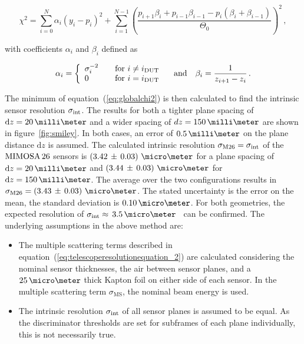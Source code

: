 \begin{equation}
\label{eq:globalchi2}
\chi^2 = \sum_{i=0}^{N} \alpha_i \left( y_i - p_i \right)^2 + \sum_{i=1}^{N-1}
\left( \frac{p_{i + 1} \beta_i + p_{i-1} \beta_{i-1} - p_i \left( \beta_i + \beta_{i-1} \right)}{\Theta_0} \right)^2 \,,
\end{equation}

\noindent
with coefficients $\alpha_i$ and $\beta_i$ defined as~\cite{ref:eudetmemo_2007_01}

\begin{equation}
\alpha_i = \left\{
  \begin{array}{l l}
    \sigma_{i}^{-2} & \quad \text{for $i \neq i_{\textrm{DUT}}$}\\
    0 & \quad \text{for $i = i_{\textrm{DUT}}$}
  \end{array} \right. \quad \text{and} \quad \beta_i = \frac{1}{z_{i + 1} - z_i} \,.
\end{equation}

The minimum of equation~(\ref{eq:globalchi2}) is then calculated to find the intrinsic sensor resolution $\sigma_{\textrm{int}}$.
The results for both a tighter plane spacing of $\dz = 20\,\milli\meter$ and a wider spacing of $dz = 150\,\milli\meter$ are shown in figure~\ref{fig:smiley}.
In both cases, an error of $0.5\,\milli\meter$ on the plane distance $\textrm{d}z$ is assumed.
The calculated intrinsic resolution $\sigma_{\textrm{M26}} = \sigma_{\textrm{int}}$ of the $\textrm{MIMOSA\,26}$ sensors is \allowbreak$\left( 3.42\,\pm\, \allowbreak 0.03 \right)\,\micro\meter$
 for a plane spacing of $\textrm{d}z =  20\,\milli\meter$ and $\left( 3.44\,\pm\, \allowbreak 0.03 \right)\,\micro\meter$ for $\textrm{d}z = 150\,\milli\meter$. 
The average over the two configurations results in $\sigma_{\textrm{M26}} = \left( 3.43\,\pm\, \allowbreak 0.03 \right)\,\micro\meter$. 
The stated uncertainty is the error on the mean, the standard deviation is $0.10\,\micro\meter$.
For both geometries, the expected resolution of $\sigmai \approx\,3.5\,\micro\meter$~\cite{ref:mimosa26} can be confirmed.
The underlying assumptions in the above method are:

\begin{itemize}

\item The multiple scattering terms described in equation~(\ref{eq:telescoperesolutionequation_2}) are calculated considering the nominal sensor thicknesses, the air between sensor planes, and a $25\,\micro\meter$
thick Kapton foil on either side of each sensor.
In the multiple scattering term $\sigma_{\textrm{MS}}$, the nominal beam energy is used. 

\item The intrinsic resolution $\sigma_{\textrm{int}}$ of all sensor planes is assumed to be equal.
As the discriminator thresholds are set for subframes of each plane individually, this is not necessarily true.

\end{itemize}

